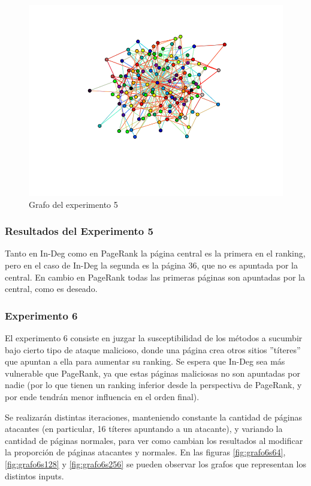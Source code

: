 \FloatBarrier
\begin{figure}[ht]
\begin{center}
\includegraphics[width=0.8\columnwidth]{imagenes/exp5}
\caption{Grafo del experimento 5}
\label{fig:grafo5}
\end{center}
\end{figure}
\FloatBarrier

\subsubsection{Resultados del Experimento 5}
\par Tanto en In-Deg como en PageRank la p\'agina central es la primera en el ranking, pero en el caso de In-Deg la segunda es la p\'agina 36, que no es apuntada por la central.
En cambio en PageRank todas las primeras p\'aginas son apuntadas por la central, como es deseado.

\subsubsection{Experimento 6}
\par El experimento 6 consiste en juzgar la susceptibilidad de los m\'etodos a sucumbir bajo cierto tipo de ataque malicioso, donde una p\'agina crea otros sitios ''t\'iteres'' que apuntan a ella para aumentar su ranking.
Se espera que In-Deg sea m\'as vulnerable que PageRank, ya que estas p\'aginas maliciosas no son apuntadas por nadie 
(por lo que tienen un ranking inferior desde la perspectiva de PageRank, y por ende tendr\'an menor influencia en el orden final).
\par Se realizar\'an distintas iteraciones, manteniendo constante la cantidad de p\'aginas atacantes (en particular, 16 t\'iteres apuntando a un atacante), 
y variando la cantidad de p\'aginas normales, para ver como cambian los resultados al modificar la proporci\'on de p\'aginas atacantes y normales.
En las figuras \ref{fig:grafo6s64}, \ref{fig:grafo6s128} y \ref{fig:grafo6s256} se pueden observar los grafos que representan los distintos inputs.

